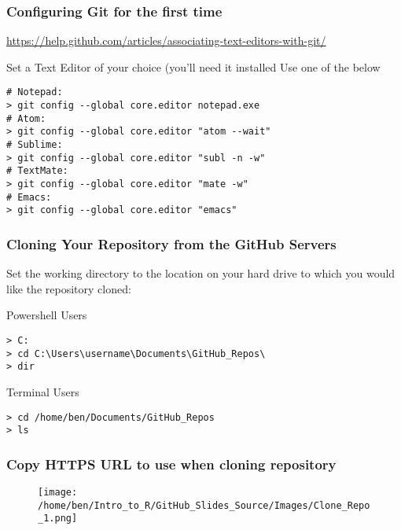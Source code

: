 \documentclass[xcolor=dvipsnames]{beamer}
\begin{document}
\begin{frame}[fragile]
\frametitle{Configuring Git for the first time}
\url{https://help.github.com/articles/associating-text-editors-with-git/}
\newline
\newline
\begin{block}{Set a Text Editor of your choice (you'll need it installed}
Use one of the below
\begin{lstlisting}
# Notepad:
> git config --global core.editor notepad.exe
# Atom:
> git config --global core.editor "atom --wait"
# Sublime:
> git config --global core.editor "subl -n -w"
# TextMate:
> git config --global core.editor "mate -w"
# Emacs:
> git config --global core.editor "emacs"
\end{lstlisting}
\end{block}

\end{frame}

\begin{frame}[fragile]
\frametitle{Cloning Your Repository from the GitHub Servers}

Set the working directory to the location on your hard drive to which you would like the repository cloned:

\begin{block}{Powershell Users}
\begin{lstlisting}
> C:
> cd C:\Users\username\Documents\GitHub_Repos\
> dir 
\end{lstlisting}
\end{block}

\begin{block}{Terminal Users}
\begin{lstlisting}
> cd /home/ben/Documents/GitHub_Repos
> ls 
\end{lstlisting}
\end{block}
\end{frame}

\begin{frame}
\frametitle{Copy HTTPS URL to use when cloning repository}
\begin{center}
\begin{figure}
\texttt{[image: /home/ben/Intro\_to\_R/GitHub\_Slides\_Source/Images/Clone\_Repo\_1.png]}
\end{figure}
\end{center}
\end{frame}
\end{document}

